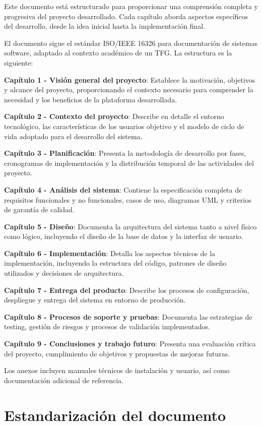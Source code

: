 \documentclass[12pt,a4paper,oneside]{report}
\begin{document}
Este documento está estructurado para proporcionar una comprensión completa y progresiva del proyecto desarrollado. Cada capítulo aborda aspectos específicos del desarrollo, desde la idea inicial hasta la implementación final.

El documento sigue el estándar ISO/IEEE 16326 para documentación de sistemas software, adaptado al contexto académico de un TFG. La estructura es la siguiente:

\textbf{Capítulo 1 - Visión general del proyecto}: Establece la
motivación, objetivos y alcance del proyecto, proporcionando el contexto
necesario para comprender la necesidad y los beneficios de la plataforma
desarrollada.

\textbf{Capítulo 2 - Contexto del proyecto}: Describe en detalle el
entorno tecnológico, las características de los usuarios objetivo y el
modelo de ciclo de vida adoptado para el desarrollo del sistema.

\textbf{Capítulo 3 - Planificación}: Presenta la metodología de
desarrollo por fases, cronogramas de implementación y la distribución
temporal de las actividades del proyecto.

\textbf{Capítulo 4 - Análisis del sistema}: Contiene la especificación
completa de requisitos funcionales y no funcionales, casos de uso,
diagramas UML y criterios de garantía de calidad.

\textbf{Capítulo 5 - Diseño}: Documenta la arquitectura del sistema
tanto a nivel físico como lógico, incluyendo el diseño de la base de
datos y la interfaz de usuario.

\textbf{Capítulo 6 - Implementación}: Detalla los aspectos técnicos de
la implementación, incluyendo la estructura del código, patrones de
diseño utilizados y decisiones de arquitectura.

\textbf{Capítulo 7 - Entrega del producto}: Describe los procesos de
configuración, despliegue y entrega del sistema en entorno de
producción.

\textbf{Capítulo 8 - Procesos de soporte y pruebas}: Documenta las
estrategias de testing, gestión de riesgos y procesos de validación
implementados.

\textbf{Capítulo 9 - Conclusiones y trabajo futuro}: Presenta una
evaluación crítica del proyecto, cumplimiento de objetivos y propuestas
de mejoras futuras.

Los anexos incluyen manuales técnicos de instalación y usuario, así como
documentación adicional de referencia.

\section{Estandarización del
documento}\label{estandarizaciuxf3n-del-documento}
\end{document}
